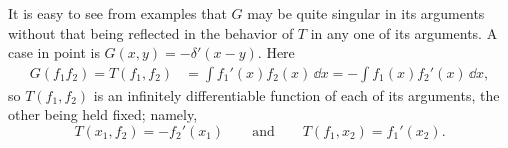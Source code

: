 It is easy to see from examples that $G$ may be quite singular in its
arguments without that being reflected in the behavior of $T$ in any one of
its arguments. A case in point is $G(x,y)=-\delta'(x-y)$. Here
\begin{equation*}
\begin{aligned}
  G(f_1f_2)=T(f_1,f_2)
    &=\int f_1'(x)f_2(x)\,\dd x
     =-\int f_1(x)f_2'(x)\,\dd x,
\end{aligned}
\end{equation*}
so $T(f_1,f_2)$ is an infinitely differentiable function of each of its
arguments, the other being held fixed; namely,
\begin{equation*}
  T(x_1,f_2)=-f_2'(x_1)
  \qquad\text{and}\qquad
  T(f_1,x_2)=f_1'(x_2).
\end{equation*}
